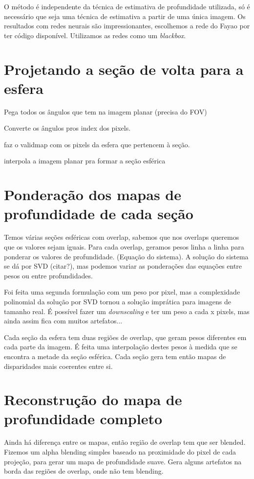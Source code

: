 \documentclass[cic,tc]{iiufrgs}
\begin{document}
O método é independente da técnica de estimativa de profundidade utilizada, só é necessário que seja uma técnica de estimativa a partir de uma única imagem. Os resultados com redes neurais são impressionantes, escolhemos a rede do Fayao por ter código disponível. Utilizamos as redes como um \textit{blackbox}.

\section{Projetando a seção de volta para a esfera}

Pega todos os ângulos que tem na imagem planar (precisa do FOV)

Converte os ângulos pros index dos pixels.

faz o validmap com os pixels da esfera que pertencem à seção.

interpola a imagem planar pra formar a seção esférica

\section{Ponderação dos mapas de profundidade de cada seção}

Temos várias seções esféricas com overlap, sabemos que nos overlaps queremos que os valores sejam iguais. Para cada overlap, geramos pesos linha a linha para ponderar os valores de profundidade. (Equação do sistema). A solução do sistema se dá por SVD (citar?), mas podemos variar as ponderações das equações entre pesos ou entre profundidades.

Foi feita uma segunda formulação com um peso por pixel, mas a complexidade polinomial da solução por SVD tornou a solução imprática para imagens de tamanho real. É possível fazer um \textit{downscaling} e ter um peso a cada x pixels, mas ainda assim fica com muitos artefatos...

Cada seção da esfera tem duas regiões de overlap, que geram pesos diferentes em cada parte da imagem. É feita uma interpolação destes pesos à medida que se encontra a metade da seção esférica. Cada seção gera tem então mapas de disparidades mais coerentes entre si.

\section{Reconstrução do mapa de profundidade completo}

Ainda há diferença entre os mapas, então região de overlap tem que ser blended. Fizemos um alpha blending simples baseado na proximidade do pixel de cada projeção, para gerar um mapa de profundidade suave. Gera alguns artefatos na borda das regiões de overlap, onde não tem blending.
\end{document}

